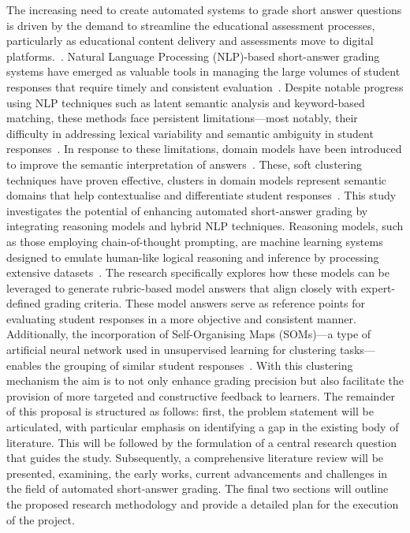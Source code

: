 \documentclass[a4paper,10pt]{article}
\begin{document}
The increasing need to create automated systems to grade short answer questions is driven by the demand to streamline the educational assessment processes, particularly as educational content delivery and assessments move to digital platforms.~\cite{burrows2015eras}. Natural Language Processing (NLP)-based short-answer grading systems have emerged as valuable tools in managing the large volumes of student responses that require timely and consistent evaluation~\cite{burrows2015eras}.\newline\newline
Despite notable progress using NLP techniques such as latent semantic analysis and keyword-based matching, these methods face persistent limitations—most notably, their difficulty in addressing lexical variability and semantic ambiguity in student responses~\cite{perez2005effects}. In response to these limitations, domain models have been introduced to improve the semantic interpretation of answers~\cite{perez2005effects,gliozzo2004unsupervised}. These, soft clustering techniques have proven effective, clusters in domain models represent semantic domains that help contextualise and differentiate student responses~\cite{gliozzo2004unsupervised}.\newline\newline
This study investigates the potential of enhancing automated short-answer grading by integrating reasoning models and hybrid NLP techniques. Reasoning models, such as those employing chain-of-thought prompting, are machine learning systems designed to emulate human-like logical reasoning and inference by processing extensive datasets~\cite{wei2023chainofthoughtpromptingelicitsreasoning}. The research specifically explores how these models can be leveraged to generate rubric-based model answers that align closely with expert-defined grading criteria. These model answers serve as reference points for evaluating student responses in a more objective and consistent manner.\newline\newline
Additionally, the incorporation of Self-Organising Maps (SOMs)—a type of artificial neural network used in unsupervised learning for clustering tasks—enables the grouping of similar student responses~\cite{kohonen1990self}. With this clustering mechanism the aim is to not only enhance grading precision but also facilitate the provision of more targeted and constructive feedback to learners.\newline\newline
The remainder of this proposal is structured as follows: first, the problem statement will be articulated, with particular emphasis on identifying a gap in the existing body of literature. This will be followed by the formulation of a central research question that guides the study. Subsequently, a comprehensive literature review will be presented, examining, the early works, current advancements and challenges in the field of automated short-answer grading. The final two sections will outline the proposed research methodology and provide a detailed plan for the execution of the project.
\end{document}
